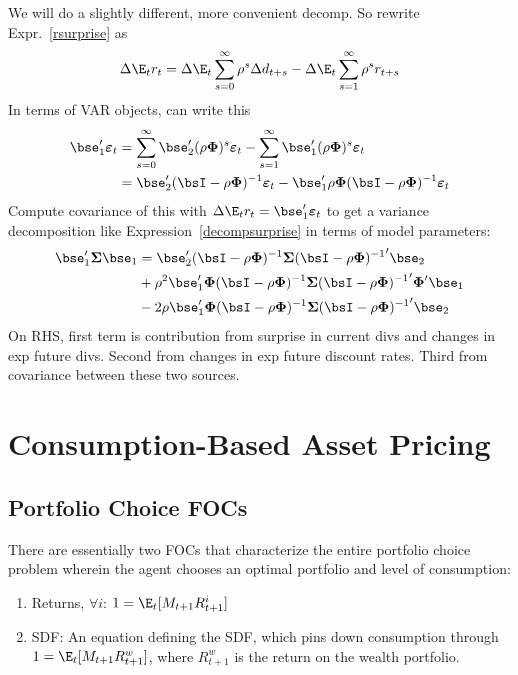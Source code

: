 \documentclass[12pt]{article}
\theoremstyle{plain}
\theoremstyle{definition}
\theoremstyle{remark}
\newcommand{\bsSigma}{\boldsymbol{\Sigma}}
\newcommand{\bsvarepsilon}{\boldsymbol{\varepsilon}}
\newcommand{\bsPhi}{\boldsymbol{\Phi}}
\begin{document}
\begin{multicols*}{2}
We will do a slightly different, more convenient decomp.
So rewrite Expr.~\ref{rsurprise} as
\begin{align*}
  \Delta\E_tr_{t}
  =
  \Delta \E_t \sum_{s=0}^\infty \rho^{s}\Delta d_{t+s}
  - \Delta \E_t \sum_{s=1}^\infty \rho^{s}r_{t+s}
\end{align*}
In terms of VAR objects, can write this
\begin{align*}
  \bse_1'\bsvarepsilon_t
  &=
  \sum_{s=0}^\infty \bse_2'(\rho\bsPhi)^{s}\bsvarepsilon_t
  - \sum_{s=1}^\infty \bse_1'(\rho\bsPhi)^{s}\bsvarepsilon_t
  \\
  &=
  \bse_2'
  (\bsI-\rho\bsPhi)^{-1}
  \bsvarepsilon_t
  -\bse_1'\rho\bsPhi
  (\bsI-\rho\bsPhi)^{-1}
  \bsvarepsilon_t
\end{align*}
Compute covariance of this with
$\Delta\E_tr_t=\bse_1'\bsvarepsilon_t$ to get a variance decomposition
like Expression~\ref{decompsurprise} in terms of model parameters:
\begin{align*}
  \bse_1'\bsSigma\bse_1
  &=
  \bse_2'
  (\bsI-\rho\bsPhi)^{-1}
  \bsSigma
  {(\bsI-\rho\bsPhi)^{-1}}'
  \bse_2
  \\
  &
  +\rho^2\bse_1'\bsPhi
  (\bsI-\rho\bsPhi)^{-1}
  \bsSigma
  {(\bsI-\rho\bsPhi)^{-1}}'
  \bsPhi'\bse_1
  \\
  &
  -
  2\rho
  \bse_1'
  \bsPhi
  (\bsI-\rho\bsPhi)^{-1}
  \bsSigma
  {(\bsI-\rho\bsPhi)^{-1}}'
  \bse_2
\end{align*}
On RHS, first term is contribution from surprise in current divs and
changes in exp future divs.
Second from changes in exp future discount rates.
Third from covariance between these two sources.


\clearpage
\section{Consumption-Based Asset Pricing}

\subsection{Portfolio Choice FOCs}

There are essentially two FOCs that characterize the entire portfolio
choice problem wherein the agent chooses an optimal portfolio and level
of consumption:
\begin{enumerate}
  \item Returns, $\forall i$: $1=\E_t[M_{t+1}R_{t+1}^i]$
  \item SDF:
    An equation defining the SDF, which pins down consumption through
    $1=\E_t[M_{t+1}R_{t+1}^w]$, where $R_{t+1}^w$ is the return on the
    wealth portfolio.


\end{enumerate}
\end{multicols*}
\end{document}
